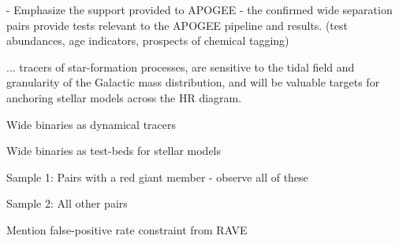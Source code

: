 \documentclass[11pt]{article}
\begin{document}
- Emphasize the support provided to APOGEE - the confirmed wide separation pairs
  provide tests relevant to the APOGEE pipeline and results. (test abundances,
  age indicators, prospects of chemical tagging)

... tracers of star-formation processes, are
sensitive to the tidal field and granularity of the Galactic mass distribution,
and will be valuable targets for anchoring stellar models across the HR diagram.

Wide binaries as dynamical tracers

Wide binaries as test-beds for stellar models

Sample 1: Pairs with a red giant member - observe all of these

Sample 2: All other pairs

Mention false-positive rate constraint from RAVE
\end{document}
